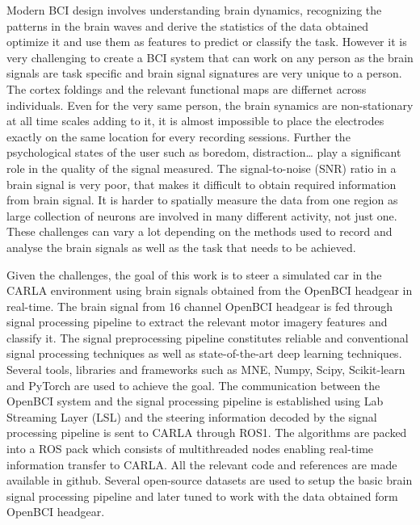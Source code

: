 Modern BCI design involves understanding brain dynamics, recognizing the patterns in the brain waves and derive the statistics of the data obtained
optimize it and use them as features to predict or classify the task. However it is very challenging to create a BCI system that can work on any person
as the brain signals are task specific and brain signal signatures are very unique to a person. The cortex foldings and the relevant functional maps are
differnet across individuals. Even for the very same person, the brain synamics are non-stationary at all time scales adding to it, it is almost impossible 
to place the electrodes exactly on the same location for every recording sessions. Further the psychological states of the user such as boredom, distraction\dots
play a significant role in the quality of the signal measured. The signal-to-noise (SNR) ratio in a brain signal is very poor, that makes it
difficult to obtain required information from brain signal. It is harder to spatially measure the data from one region as large collection of neurons
are involved in many different activity, not just one. These challenges can vary a lot depending on the methods used to record and analyse the brain signals
as well as the task that needs to be achieved.

Given the challenges, the goal of this work is to steer a simulated car in the CARLA environment using brain signals obtained from the OpenBCI headgear in real-time.
The brain signal from 16 channel OpenBCI headgear is fed through signal processing pipeline to extract the relevant motor imagery features and classify it.
The signal preprocessing pipeline constitutes reliable and conventional signal processing techniques as well as state-of-the-art deep learning techniques.
Several tools, libraries and frameworks such as MNE, Numpy, Scipy, Scikit-learn and PyTorch are used to achieve the goal.
The communication between the OpenBCI system and the signal processing pipeline is established using Lab Streaming Layer (LSL) and the steering information
decoded by the signal processing pipeline is sent to CARLA through ROS1. The algorithms are packed into a ROS pack which consists of multithreaded nodes enabling
real-time information transfer to CARLA. All the relevant code and references are made available in github. Several open-source datasets are used to setup the basic 
brain signal processing pipeline and later tuned to work with the data obtained form OpenBCI headgear. 

